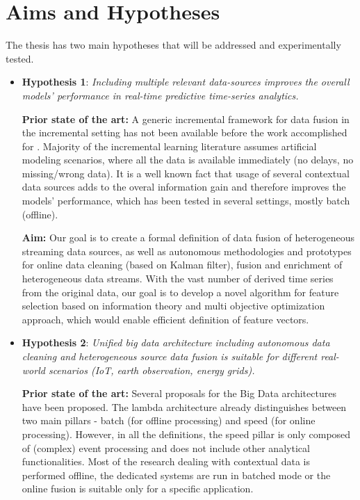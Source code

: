 \section{Aims and Hypotheses}

\noindent The thesis has two main hypotheses that will be addressed and experimentally tested.

\begin{itemize}
    \item \textbf{Hypothesis 1}: \textit{Including multiple relevant data-sources improves the overall models’ performance in real-time predictive time-series analytics.} 
    
    \textbf{Prior state of the art:}
    A generic incremental framework for data fusion in the incremental setting has not been available before the work accomplished for \cite{kenda:2019:fusion}.
    Majority of the incremental learning literature assumes artificial modeling scenarios, where all the data is available immediately (no delays, no missing/wrong data).
    It is a well known fact that usage of several contextual data sources adds to the overal information gain and therefore improves the models' performance, which has been tested in several settings, mostly batch (offline).
    
    \textbf{Aim:} 
    Our goal is to create a formal definition of data fusion of heterogeneous streaming data sources, as well as autonomous methodologies and prototypes for online data cleaning (based on Kalman filter), fusion and enrichment of heterogeneous data streams. 
    With the vast number of derived time series from the original data, our goal is to develop a novel algorithm for feature selection based on information theory and multi objective optimization approach, which would enable efficient definition of feature vectors.
    
    \item \textbf{Hypothesis 2}: \textit{Unified big data architecture including autonomous data cleaning and heterogeneous source data fusion is suitable for different real-world scenarios (IoT, earth observation, energy grids).}

    \textbf{Prior state of the art:}
    Several proposals for the Big Data architectures have been proposed.
    The lambda architecture already distinguishes between two main pillars - batch (for offline processing) and speed (for online processing).
    However, in all the definitions, the speed pillar is only composed of (complex) event processing and does not include other analytical functionalities.
    Most of the research dealing with contextual data is performed offline, the dedicated systems are run in batched mode or the online fusion is suitable only for a specific application.
    

\end{itemize}
